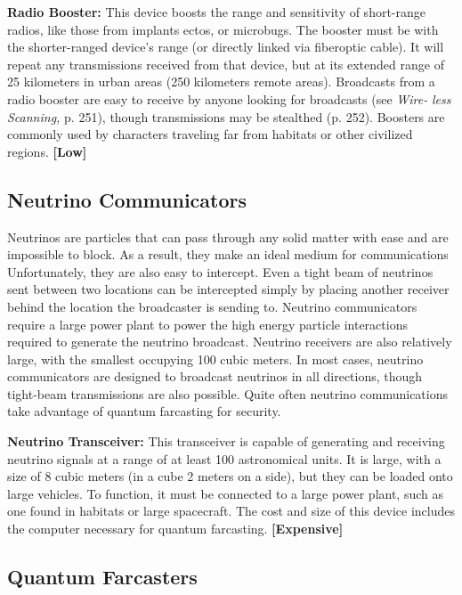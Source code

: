 \textbf{Radio Booster:} This device boosts the range and 
sensitivity of short-range radios, like those from implants
ectos, or microbugs. The booster must be with
the shorter-ranged device's range (or directly linked 
via fiberoptic cable). It will repeat any transmissions 
received from that device, but at its extended range of 
25 kilometers in urban areas (250 kilometers remote 
areas). Broadcasts from a radio booster are easy to 
receive by anyone looking for broadcasts (see \textit{Wire-}
\textit{less Scanning,} p. 251), though transmissions may be 
stealthed (p. 252). Boosters are commonly used by 
characters traveling far from habitats or other civilized
regions. \textbf{[Low]}

\subsection{Neutrino Communicators}

Neutrinos are particles that can pass through any 
solid matter with ease and are impossible to block. As 
a result, they make an ideal medium for communications
Unfortunately, they are also easy to intercept.
Even a tight beam of neutrinos sent between two locations
can be intercepted simply by placing another
receiver behind the location the broadcaster is sending 
to. Neutrino communicators require a large power 
plant to power the high energy particle interactions 
required to generate the neutrino broadcast. Neutrino 
receivers are also relatively large, with the smallest 
occupying 100 cubic meters. In most cases, neutrino 
communicators are designed to broadcast neutrinos 
in all directions, though tight-beam transmissions are 
also possible. Quite often neutrino communications 
take advantage of quantum farcasting for security.

\textbf{Neutrino Transceiver:} This transceiver is capable of 
generating and receiving neutrino signals at a range of 
at least 100 astronomical units. It is large, with a size 
of 8 cubic meters (in a cube 2 meters on a side), but 
they can be loaded onto large vehicles. To function, it 
must be connected to a large power plant, such as one 
found in habitats or large spacecraft. The cost and 
size of this device includes the computer necessary for 
quantum farcasting. \textbf{[Expensive]}

\subsection{Quantum Farcasters}


